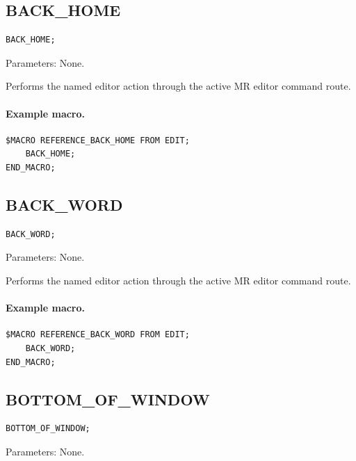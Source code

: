 \documentclass[a4paper,10pt,twoside,openany]{book}
\newenvironment{mrmacextension}{\begin{changebar}}{\end{changebar}}
\begin{document}
\begin{mrmacextension}
\label{prim:procedure-back-home}
\subsection*{BACK\_HOME}
\begin{verbatim}
BACK_HOME;
\end{verbatim}
Parameters: None.

Performs the named editor action through the active MR editor command route.

\paragraph{Example macro.}
\begin{verbatim}
$MACRO REFERENCE_BACK_HOME FROM EDIT;
    BACK_HOME;
END_MACRO;
\end{verbatim}
\end{mrmacextension}

\begin{mrmacextension}
\label{prim:procedure-back-word}
\subsection*{BACK\_WORD}
\begin{verbatim}
BACK_WORD;
\end{verbatim}
Parameters: None.

Performs the named editor action through the active MR editor command route.

\paragraph{Example macro.}
\begin{verbatim}
$MACRO REFERENCE_BACK_WORD FROM EDIT;
    BACK_WORD;
END_MACRO;
\end{verbatim}
\end{mrmacextension}

\label{prim:procedure-bottom-of-window}
\subsection*{BOTTOM\_OF\_WINDOW}
\begin{verbatim}
BOTTOM_OF_WINDOW;
\end{verbatim}
Parameters: None.
\end{document}
